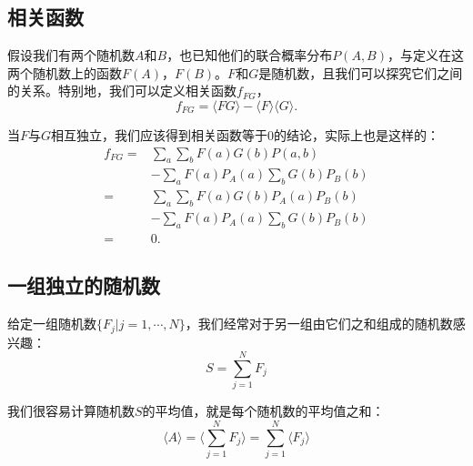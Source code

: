 \documentclass[UTF8]{ctexart}
\numberwithin{equation}{section}%
\numberwithin{figure}{section}%
\begin{document}
    \subsection{相关函数}
    假设我们有两个随机数$A$和$B$，也已知他们的联合概率分布$P(A,B)$，与定义在这两个随机数上的函数$F(A)$，$F(B)$。$F$和$G$是随机数，且我们可以探究它们之间的关系。特别地，我们可以定义相关函数$f_{FG}$，
    \begin{equation}
        f_{FG}=\langle{FG}\rangle-\langle{F}\rangle\langle{G}\rangle.
    \end{equation}
    
    当$F$与$G$相互独立，我们应该得到相关函数等于$0$的结论，实际上也是这样的：
    \begin{equation}
        \begin{aligned}
            f_{FG}=&\sum_a\sum_bF(a)G(b)P(a,b)\\
            &-\sum_aF(a)P_A(a)\sum_bG(b)P_B(b)\\
            =&\sum_a\sum_bF(a)G(b)P_A(a)P_B(b)\\
            &-\sum_aF(a)P_A(a)\sum_bG(b)P_B(b)\\
            =&0.
        \end{aligned}
    \end{equation}
    
    \subsection{一组独立的随机数}\label{sec3.7}
    给定一组随机数$\{F_j|j=1,\cdots ,N\}$，我们经常对于另一组由它们之和组成的随机数感兴趣：
    \begin{equation}
        S=\sum^N_{j=1}F_j
    \end{equation}

    我们很容易计算随机数$S$的平均值，就是每个随机数的平均值之和：
    \begin{equation}
        \langle{A}\rangle=\langle{\sum^N_{j=1}F_j}\rangle=\sum^N_{j=1}\langle{F_j}\rangle
    \end{equation}
\end{document}
